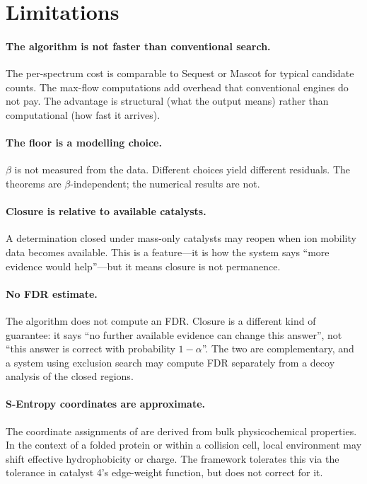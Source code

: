\documentclass[11pt,a4paper]{article}
\theoremstyle{definition}
\theoremstyle{remark}
\newcommand{\flo}{\beta}
\begin{document}
\section{Limitations}
\label{sec:limits}

\paragraph{The algorithm is not faster than conventional search.}
The per-spectrum cost is comparable to Sequest or Mascot for typical
candidate counts. The max-flow computations add overhead that
conventional engines do not pay. The advantage is structural (what the
output means) rather than computational (how fast it arrives).

\paragraph{The floor is a modelling choice.}
$\flo$ is not measured from the data. Different choices yield different
residuals. The theorems are $\flo$-independent; the numerical results
are not.

\paragraph{Closure is relative to available catalysts.}
A determination closed under mass-only catalysts may reopen when ion
mobility data becomes available. This is a feature---it is how the
system says ``more evidence would help''---but it means closure is not
permanence.

\paragraph{No FDR estimate.}
The algorithm does not compute an FDR. Closure is a different kind of
guarantee: it says ``no further available evidence can change this
answer'', not ``this answer is correct with probability $1-\alpha$''.
The two are complementary, and a system using exclusion search may
compute FDR separately from a decoy analysis of the closed regions.

\paragraph{S-Entropy coordinates are approximate.}
The coordinate assignments of  are derived from
bulk physicochemical properties. In the context of a folded protein or
within a collision cell, local environment may shift effective
hydrophobicity or charge. The framework tolerates this via the
tolerance in catalyst 4's edge-weight function, but does not correct
for it.
\end{document}
